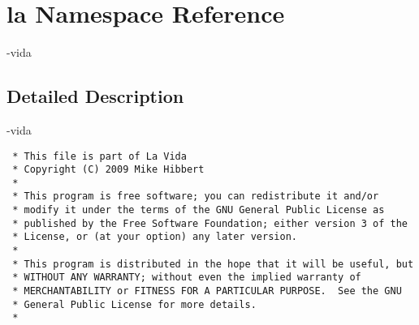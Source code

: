 \hypertarget{namespacela}{
\section{la Namespace Reference}
\label{namespacela}
}
-vida  




\subsection{Detailed Description}
-vida 



\footnotesize\begin{verbatim}
 * This file is part of La Vida
 * Copyright (C) 2009 Mike Hibbert
 *
 * This program is free software; you can redistribute it and/or
 * modify it under the terms of the GNU General Public License as
 * published by the Free Software Foundation; either version 3 of the
 * License, or (at your option) any later version.
 *
 * This program is distributed in the hope that it will be useful, but
 * WITHOUT ANY WARRANTY; without even the implied warranty of
 * MERCHANTABILITY or FITNESS FOR A PARTICULAR PURPOSE.  See the GNU
 * General Public License for more details.
 *
\end{verbatim}
\normalsize
 